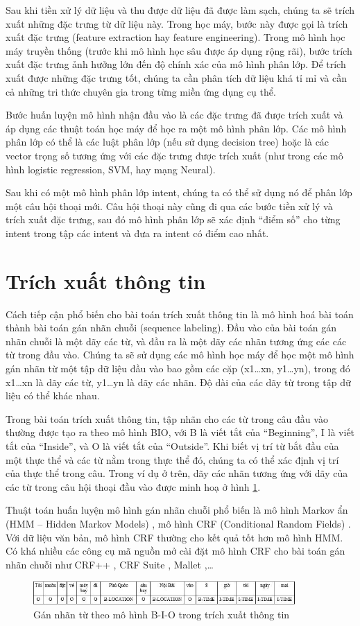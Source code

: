 Sau khi tiền xử lý dữ liệu và thu được dữ liệu đã được làm sạch, chúng ta sẽ trích xuất những đặc trưng từ dữ liệu này. Trong học máy, bước này được gọi là trích xuất đặc trưng (feature extraction hay feature engineering). Trong mô hình học máy truyền thống (trước khi mô hình học sâu được áp dụng rộng rãi), bước trích xuất đặc trưng ảnh hưởng lớn đến độ chính xác của mô hình phân lớp. Để trích xuất được những đặc trưng tốt, chúng ta cần phân tích dữ liệu khá tỉ mỉ và cần cả những tri thức chuyên gia trong từng miền ứng dụng cụ thể.

Bước huấn luyện mô hình nhận đầu vào là các đặc trưng đã được trích xuất và áp dụng các thuật toán học máy để học ra một mô hình phân lớp. Các mô hình phân lớp có thể là các luật phân lớp (nếu sử dụng decision tree) hoặc là các vector trọng số tương ứng với các đặc trưng được trích xuất (như trong các mô hình logistic regression, SVM, hay mạng Neural).

Sau khi có một mô hình phân lớp intent, chúng ta có thể sử dụng nó để phân lớp một câu hội thoại mới. Câu hội thoại này cũng đi qua các bước tiền xử lý và trích xuất đặc trưng, sau đó mô hình phân lớp sẽ xác định “điểm số” cho từng intent trong tập các intent và đưa ra intent có điểm cao nhất.

\section{Trích xuất thông tin}

Cách tiếp cận phổ biến cho bài toán trích xuất thông tin là mô hình hoá bài toán thành bài toán gán nhãn chuỗi (sequence labeling). Đầu vào của bài toán gán nhãn chuỗi là một dãy các từ, và đầu ra là một dãy các nhãn tương ứng các các từ trong đầu vào. Chúng ta sẽ sử dụng các mô hình học máy để học một mô hình gán nhãn từ một tập dữ liệu đầu vào bao gồm các cặp (x1…xn, y1…yn), trong đó x1…xn là dãy các từ, y1…yn là dãy các nhãn. Độ dài của các dãy từ trong tập dữ liệu có thể khác nhau.

Trong bài toán trích xuất thông tin, tập nhãn cho các từ trong câu đầu vào thường được tạo ra theo  mô hình BIO, với B là viết tắt của “Beginning”, I là viết tắt của “Inside”, và O là viết tắt của “Outside”. Khi biết vị trí từ bắt đầu của một thực thể và các từ nằm trong thực thể đó, chúng ta có thể xác định vị trí của thực thể trong câu. Trong ví dụ ở trên, dãy các nhãn tương ứng với dãy của các từ trong câu hội thoại đầu vào được minh hoạ ở hình \ref{fig:model-BIO}.

Thuật toán huấn luyện mô hình gán nhãn chuỗi phổ biến là mô hình Markov ẩn (HMM – Hidden Markov Models) \cite{2}, mô hình CRF (Conditional Random Fields) \cite{3}. Với dữ liệu văn bản, mô hình CRF thường cho kết quả tốt hơn mô hình HMM. Có khá nhiều các công cụ mã nguồn mở cài đặt mô hình CRF cho bài toán gán nhãn chuỗi như CRF++ \cite{4}, CRF Suite \cite{5}, Mallet \cite{6},…

\begin{figure}[htp]
    \centering
    \includegraphics[width=10cm]{images/Model-BIO.png}
    \caption{Gán nhãn từ theo mô hình B-I-O trong trích xuất thông tin}
    \label{fig:model-BIO}
\end{figure}
